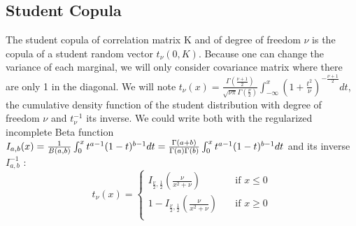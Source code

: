 \documentclass{article}
\begin{document}
	\subsection{Student Copula}
	The student copula of correlation matrix K and of degree of freedom \begin{math} \nu \end{math} is the copula of a student random vector \begin{math} t_\nu (0,K) \end{math}.\newline
	\newline
	Because one can change the variance of each marginal, we will only consider covariance matrix where there are only 1 in the diagonal.
	\newline
	\newline
	We will note \begin{math} t_\nu(x)=\frac{\Gamma (\frac{\nu+1}{2})}{\sqrt{\nu \pi} \Gamma (\frac{\nu}{2})}\int_{-\infty}^{x} \left(1+\frac{t^2}{\nu}\right)^{-\frac{\nu +1}{2}}dt \end{math}, the cumulative density function of the student distribution with degree of freedom \begin{math} \nu \end{math} and \begin{math}  t_\nu^{-1} \end{math} its inverse. \newline
	We could write both with the regularized incomplete Beta function \newline \begin{math} I_{a,b}(x) = \frac{1}{B(a,b)} \int_{0}^{x} t^{a-1}(1-t)^{b-1}dt \newline = \frac{\Gamma (a+b)}{\Gamma (a)\Gamma (b)} \int_{0}^{x} t^{a-1}(1-t)^{b-1}dt\end{math} \newline
	\newline
	and its inverse \begin{math} I_{a,b}^{-1} \end{math} : \newline
	\[
   		t_\nu (x) =  \begin{cases}
        I_{\frac{\nu}{2},\frac{1}{2}}(\frac{\nu}{x^2+\nu})  & \quad \text{if } x \leq 0 \\
    	1-I_{\frac{\nu}{2},\frac{1}{2}}(\frac{\nu}{x^2+\nu}) & \quad \text{if } x \geq 0\\
  	\end{cases}
  	\]
\end{document}
